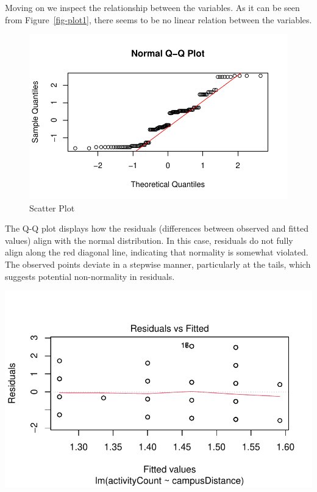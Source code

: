 \documentclass[
  letterpaper,
  DIV=11,
  numbers=noendperiod]{scrartcl}
\begin{document}
Moving on we inspect the relationship between the variables. As it can
be seen from Figure~\ref{fig-plot1}, there seems to be no linear
relation between the variables.

\begin{figure}[H]

{\centering \includegraphics{technical_report_files/figure-pdf/plot2-1.pdf}

}

\caption{Scatter Plot}

\end{figure}%

The Q-Q plot displays how the residuals (differences between observed
and fitted values) align with the normal distribution. In this case,
residuals do not fully align along the red diagonal line, indicating
that normality is somewhat violated. The observed points deviate in a
stepwise manner, particularly at the tails, which suggests potential
non-normality in residuals.

\includegraphics{technical_report_files/figure-pdf/plot3-1.pdf}
\end{document}

